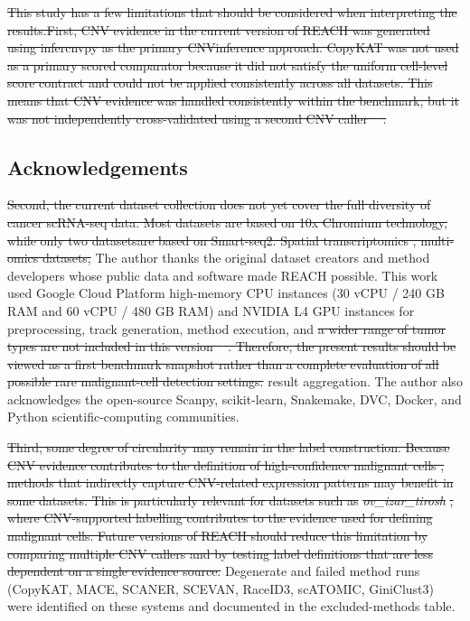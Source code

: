 \documentclass[10pt]{article}
\providecommand{\DIFaddtex}[1]{{\protect\color{trackgreen}#1}} %
\providecommand{\DIFdeltex}[1]{{\protect\color{red}\sout{#1}}}                      %
\providecommand{\DIFaddbegin}{} %
\providecommand{\DIFaddend}{} %
\providecommand{\DIFdelbegin}{} %
\providecommand{\DIFdelend}{} %
\providecommand{\DIFadd}[1]{\texorpdfstring{\DIFaddtex{#1}}{#1}} %
\providecommand{\DIFdel}[1]{\texorpdfstring{\DIFdeltex{#1}}{}} %
\newcommand{\DIFscaledelfig}{0.5}
\newlength{\DIFdelgraphicswidth} %
\newlength{\DIFdelgraphicsheight} %
\newcommand{\DIFaddincludegraphics}[2][]{{\color{trackgreen}\fbox{\DIFOincludegraphics[#1]{#2}}}} %
\newcommand{\DIFdelincludegraphics}[2][]{%
\sbox{\DIFdelgraphicsbox}{\DIFOincludegraphics[#1]{#2}}%
\settoboxwidth{\DIFdelgraphicswidth}{\DIFdelgraphicsbox} %
\settoboxtotalheight{\DIFdelgraphicsheight}{\DIFdelgraphicsbox} %
\scalebox{\DIFscaledelfig}{%
\parbox[b]{\DIFdelgraphicswidth}{\usebox{\DIFdelgraphicsbox}\\[-\baselineskip] \rule{\DIFdelgraphicswidth}{0em}}\llap{\resizebox{\DIFdelgraphicswidth}{\DIFdelgraphicsheight}{%
\setlength{\unitlength}{\DIFdelgraphicswidth}%
\begin{picture}(1,1)%
\thicklines\linethickness{2pt} %
{\color[rgb]{1,0,0}\put(0,0){\framebox(1,1){}}}%
{\color[rgb]{1,0,0}\put(0,0){\line( 1,1){1}}}%
{\color[rgb]{1,0,0}\put(0,1){\line(1,-1){1}}}%
\end{picture}%
}\hspace*{3pt}}} %
} %
\DeclareRobustCommand{\DIFaddbegin}{\DIFOaddbegin \let\includegraphics\DIFaddincludegraphics} %
\DeclareRobustCommand{\DIFaddend}{\DIFOaddend \let\includegraphics\DIFOincludegraphics} %
\DeclareRobustCommand{\DIFdelbegin}{\DIFOdelbegin \let\includegraphics\DIFdelincludegraphics} %
\DeclareRobustCommand{\DIFdelend}{\DIFOaddend \let\includegraphics\DIFOincludegraphics} %
\begin{document}
\DIFdelbegin \DIFdel{This study has a few limitations that should be considered when interpreting the results.First,
  CNV evidence in the
  current version of REACH was generated using infercnvpy as the primary CNVinference approach. CopyKAT was not used as a primary scored comparator because it did not satisfy the uniform cell-level score contract and could not be applied consistently across all datasets. This means that CNV evidence was handled consistently within the benchmark, but
  it was not independently cross-validated using a second CNV caller \mbox{%
\cite{chen2025benchmarking,gao2021delineating}}\hskip0pt%
. }\DIFdelend \DIFaddbegin \subsection{\DIFadd{Acknowledgements}}\label{acknowledgements}
\DIFaddend 

\DIFdelbegin \DIFdel{Second, the current dataset collection does not yet cover the full diversity of cancer scRNA-seq data.
Most datasets are based on 10x Chromium technology, while only two datasetsare based on Smart-seq2. Spatial transcriptomics , multi-omics datasets, }\DIFdelend \DIFaddbegin \DIFadd{The author thanks the original dataset creators and method developers
whose public data and software made REACH possible. This work used
Google Cloud Platform high-memory CPU instances (30 vCPU / 240 GB RAM
and 60 vCPU / 480 GB RAM) and NVIDIA L4 GPU instances for preprocessing,
track generation, method execution, }\DIFaddend and \DIFdelbegin \DIFdel{a wider range of tumor types are not included in this version \mbox{%
\cite{jovic2022single}}\hskip0pt%
.
Therefore, the present results should be viewed as a first benchmark snapshot rather than a complete evaluation of all possible rare malignant-cell detection settings.
}\DIFdelend \DIFaddbegin \DIFadd{result aggregation. The author
also acknowledges the open-source Scanpy, scikit-learn, Snakemake, DVC,
Docker, and Python scientific-computing communities.
}\DIFaddend 

\DIFdelbegin \DIFdel{Third, some degree of circularity may remain in the label construction. Because CNV evidence contributes to the definition of high-confidence malignant cells , methods that indirectly capture CNV-related expression patterns may benefit in some datasets. This is particularly relevant for datasets such as }\textit{\DIFdel{ov\_izar\_tirosh}}%
\DIFdel{, where CNV-supported labelling contributes to the evidence used for defining malignant cells. Future versions of REACH should reduce this limitation by comparing multiple CNV callers and by testing label
  definitions that are less dependent on a single evidence source. }\DIFdelend \DIFaddbegin \DIFadd{Degenerate and failed method runs (CopyKAT, MACE, SCANER, SCEVAN,
RaceID3, scATOMIC, GiniClust3) were identified on these systems and
documented in the excluded-methods table.
}\DIFaddend 
\end{document}
